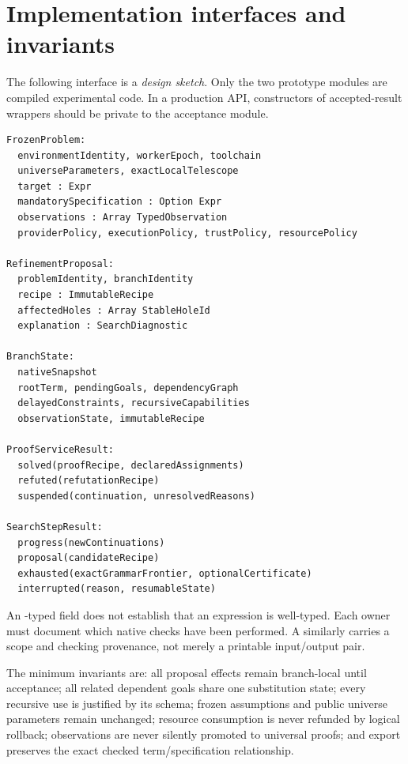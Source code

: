 \clearpage
\appendix
\section{Implementation interfaces and invariants}
\label{app:interfaces}

The following interface is a \emph{design sketch}. Only the two prototype modules are compiled experimental code. In a production API, constructors of accepted-result wrappers should be private to the acceptance module.

\par\noindent\begin{minipage}{\linewidth}
\begin{lstlisting}[language={}]
FrozenProblem:
  environmentIdentity, workerEpoch, toolchain
  universeParameters, exactLocalTelescope
  target : Expr
  mandatorySpecification : Option Expr
  observations : Array TypedObservation
  providerPolicy, executionPolicy, trustPolicy, resourcePolicy

RefinementProposal:
  problemIdentity, branchIdentity
  recipe : ImmutableRecipe
  affectedHoles : Array StableHoleId
  explanation : SearchDiagnostic

BranchState:
  nativeSnapshot
  rootTerm, pendingGoals, dependencyGraph
  delayedConstraints, recursiveCapabilities
  observationState, immutableRecipe

ProofServiceResult:
  solved(proofRecipe, declaredAssignments)
  refuted(refutationRecipe)
  suspended(continuation, unresolvedReasons)

SearchStepResult:
  progress(newContinuations)
  proposal(candidateRecipe)
  exhausted(exactGrammarFrontier, optionalCertificate)
  interrupted(reason, resumableState)
\end{lstlisting}
\end{minipage}\par

An -typed field does not establish that an expression is well-typed. Each owner must document which native checks have been performed. A  similarly carries a scope and checking provenance, not merely a printable input/output pair.

The minimum invariants are: all proposal effects remain branch-local until acceptance; all related dependent goals share one substitution state; every recursive use is justified by its schema; frozen assumptions and public universe parameters remain unchanged; resource consumption is never refunded by logical rollback; observations are never silently promoted to universal proofs; and export preserves the exact checked term/specification relationship.

